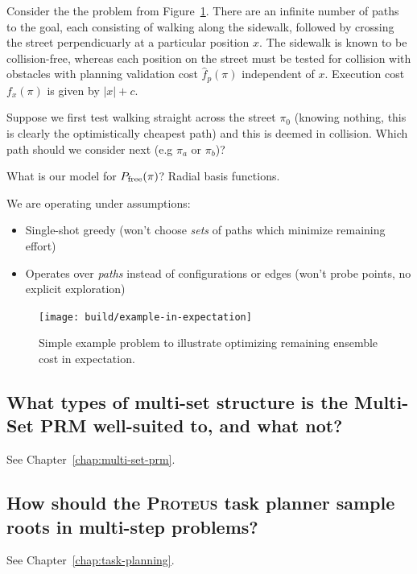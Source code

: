 \documentclass{report}
\begin{document}
{Consider the the problem from Figure~\ref{fig:example-in-expectation}.
There are an infinite number of paths to the goal,
each consisting of walking along the sidewalk,
followed by crossing the street perpendicuarly at a particular
position $x$.
The sidewalk is known to be collision-free,
whereas each position on the street must be tested for collision
with obstacles with planning validation cost $\hat{f}_p(\pi)$
independent of $x$.
Execution cost $f_x(\pi)$ is given by $|x|+c$.

Suppose we first test walking straight across the street $\pi_0$
(knowing nothing, this is clearly the optimistically cheapest path)
and this is deemed in collision.
Which path should we consider next (e.g $\pi_a$ or $\pi_b$)?

What is our model for $P_{\mbox{\scriptsize free}}(\pi)$?
Radial basis functions.

We are operating under assumptions:
\begin{itemize}
\item Single-shot greedy (won't choose \emph{sets} of paths
   which minimize remaining effort)
\item Operates over \emph{paths} instead of configurations
   or edges (won't probe points, no explicit exploration)
\end{itemize}

\begin{figure}
   \begin{center}
   \texttt{[image: build/example-in-expectation]}
   \end{center}
   \caption{Simple example problem to illustrate optimizing
      remaining ensemble cost in expectation.}
   \label{fig:example-in-expectation}
\end{figure}

\subsection{What types of multi-set structure is the Multi-Set PRM
   well-suited to, and what not?}
\label{ques:multi-set-suited}

See Chapter~\ref{chap:multi-set-prm}.

\subsection{How should the \textsc{Proteus} task planner
   sample roots in multi-step problems?}
\label{ques:how-sequence}

See Chapter~\ref{chap:task-planning}.

}
\end{document}
